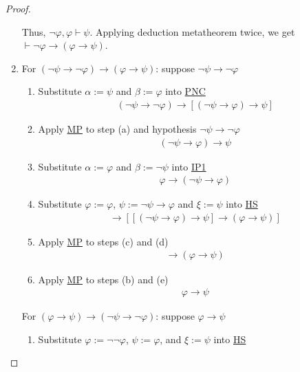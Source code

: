 \documentclass{treatise}
\begin{document}
\begin{proof}
\begin{enumerate}
\begin{enumerate}
    \end{enumerate}
    Thus, $\neg \varphi, \varphi \vdash \psi$. Applying deduction metatheorem twice, we get $\vdash \neg \varphi \to (\varphi \to \psi)$.
    \item For $(\neg \psi \to \neg \varphi) \to (\varphi \to \psi)$: suppose $\neg \psi \to \neg \varphi$
    \begin{enumerate}
        \item Substitute $\alpha := \psi$ and $\beta := \varphi$ into \hyperref[HPL-A-PNC]{PNC}
        \begin{align*}
            (\neg \psi \to \neg \varphi) \to [(\neg \psi \to \varphi) \to \psi]
        \end{align*}
        \item Apply \hyperref[HPL-R-MP]{MP} to step (a) and hypothesis $\neg \psi \to \neg \varphi$
        \begin{align*}
            (\neg \psi \to \varphi) \to \psi
        \end{align*}
        \item Substitute $\alpha := \varphi$ and $\beta := \neg \psi$ into \hyperref[HPL-A-IP1]{IP1}
        \begin{align*}
            \varphi \to (\neg \psi \to \varphi)
        \end{align*}
        \item Substitute $\varphi := \varphi$, $\psi := \neg \psi \to \varphi$ and $\xi := \psi$ into \hyperref[HPL-T-HS]{HS}
        \begin{align*}
            [\varphi \to (\neg \psi \to \varphi)] \to [[(\neg \psi \to \varphi) \to \psi] \to (\varphi \to \psi)]
        \end{align*}
        \item Apply \hyperref[HPL-R-MP]{MP} to steps (c) and (d)
        \begin{align*}
            [(\neg \psi \to \varphi) \to \psi] \to (\varphi \to \psi)
        \end{align*}
        \item Apply \hyperref[HPL-R-MP]{MP} to steps (b) and (e)
        \begin{align*}
            \varphi \to \psi
        \end{align*}
    \end{enumerate}
    For $(\varphi \to \psi) \to (\neg \psi \to \neg \varphi)$: suppose $\varphi \to \psi$
    \begin{enumerate}
        \item Substitute $\varphi := \neg \neg \varphi$, $\psi := \varphi$, and $\xi := \psi$ into \hyperref[HPL-T-HS]{HS}

\end{enumerate}
\end{enumerate}
\end{proof}
\end{document}
